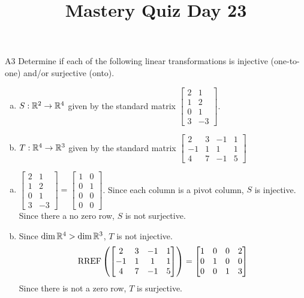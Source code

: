 \documentclass{sbgLAquiz}
\title{Mastery Quiz Day 23 }
\begin{document}
\begin{problem}{A3}
Determine if each of the following linear transformations is injective (one-to-one) and/or surjective (onto).
\begin{enumerate}[(a)]
\item $S: \mathbb{R}^2 \rightarrow \mathbb{R}^4$ given by the standard matrix $\begin{bmatrix} 2 & 1 \\ 1 & 2 \\ 0 & 1 \\ 3 & -3 \end{bmatrix}$.
\item $T: \mathbb{R}^4 \rightarrow \mathbb{R}^3$ given by the standard matrix $\begin{bmatrix} 2 & 3 & -1 & 1 \\ -1 & 1 & 1 & 1 \\ 4 & 7 & -1 & 5 \end{bmatrix}$
\end{enumerate}
\end{problem}
\begin{solution}
\begin{enumerate}[(a)]
\item $ \begin{bmatrix} 2 & 1 \\ 1 & 2 \\ 0 & 1 \\ 3 & -3 \end{bmatrix}=\begin{bmatrix}1 & 0 \\ 0 & 1 \\ 0 & 0 \\ 0 & 0  \end{bmatrix}$.  Since each column is a pivot column, $S$ is injective.  Since there a no zero row, $S$ is not surjective.
\item Since $\dim \mathbb{R}^4 > \dim \mathbb{R}^3$, $T$ is not injective.
$$\operatorname{RREF}\left(\begin{bmatrix} 2 & 3 & -1 & 1 \\ -1 & 1 & 1 & 1 \\ 4 & 7 & -1 & 5 \end{bmatrix}\right) = \begin{bmatrix} 1 & 0  & 0 & 2 \\ 0 & 1 & 0 & 0  \\ 0 & 0 & 1 & 3 \end{bmatrix}$$
Since there is not a zero row, $T$ is surjective.
\end{enumerate}
\end{solution}
\end{document}
